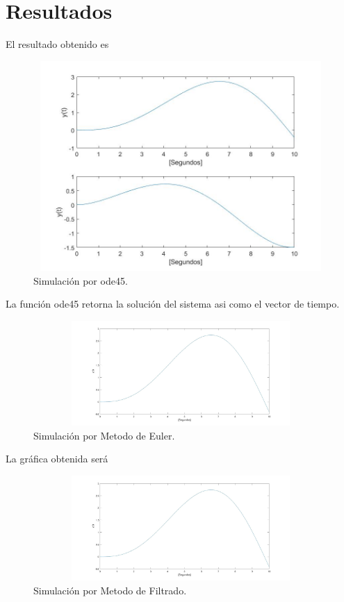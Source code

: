 \documentclass[12pt]{article}
\begin{document}
\section{Resultados}

El resultado obtenido es
        \begin{figure}[h]
            \centering
            \includegraphics[width=13cm,height=8cm]{IMAGENES/9.jpg}
            \caption{Simulación por ode45.}
        \end{figure}

        La función ode45 retorna la solución del sistema asi como el vector de tiempo.

        \begin{figure}[h]
            \centering
            \includegraphics[width=15cm,height=4cm]{IMAGENES/10.jpg}
            \caption{Simulación por Metodo de Euler.}
        \end{figure}

        La gráfica obtenida será

        \begin{figure}[h]
            \centering
            \includegraphics[width=15cm,height=4cm]{IMAGENES/11.jpg}
            \caption{Simulación por Metodo de Filtrado.}
        \end{figure}
\end{document}
